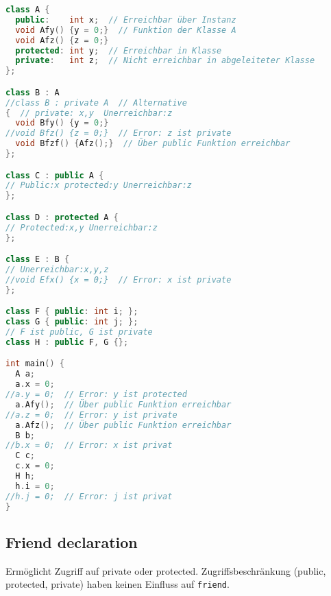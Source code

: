 \begin{lstlisting}[language=C++]
class A {
  public:    int x;  // Erreichbar über Instanz
  void Afy() {y = 0;}  // Funktion der Klasse A
  void Afz() {z = 0;}
  protected: int y;  // Erreichbar in Klasse
  private:   int z;  // Nicht erreichbar in abgeleiteter Klasse
};

class B : A
//class B : private A  // Alternative
{  // private: x,y  Unerreichbar:z
  void Bfy() {y = 0;}
//void Bfz() {z = 0;}  // Error: z ist private
  void Bfzf() {Afz();}  // Über public Funktion erreichbar
};

class C : public A {
// Public:x protected:y Unerreichbar:z
};

class D : protected A {
// Protected:x,y Unerreichbar:z
};

class E : B {
// Unerreichbar:x,y,z
//void Efx() {x = 0;}  // Error: x ist private
};

class F { public: int i; };
class G { public: int j; };
// F ist public, G ist private
class H : public F, G {};

int main() {
  A a;
  a.x = 0;
//a.y = 0;  // Error: y ist protected
  a.Afy();  // Über public Funktion erreichbar
//a.z = 0;  // Error: y ist private
  a.Afz();  // Über public Funktion erreichbar
  B b;
//b.x = 0;  // Error: x ist privat
  C c;
  c.x = 0;
  H h;
  h.i = 0;
//h.j = 0;  // Error: j ist privat
}
\end{lstlisting}

\subsection{Friend declaration}

Ermöglicht Zugriff auf private oder protected. Zugriffsbeschränkung (public,
protected, private) haben keinen Einfluss auf \lstinline|friend|.

